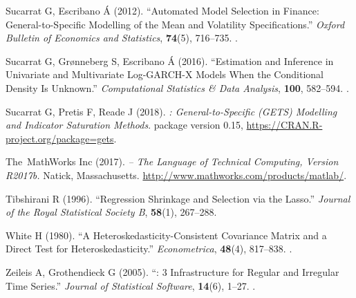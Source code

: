 \documentclass[article,nojss]{jss}
\begin{document}
\begin{thebibliography}{56}
	Sucarrat G, Escribano {\'A} (2012).
	\newblock \enquote{Automated Model Selection in Finance: General-to-Specific
		Modelling of the Mean and Volatility Specifications.}
	\newblock \emph{Oxford Bulletin of Economics and Statistics}, \textbf{74}(5),
	716--735.
	\newblock {}.
	
	Sucarrat G, Gr{\o}nneberg S, Escribano {\'A} (2016).
	\newblock \enquote{Estimation and Inference in Univariate and Multivariate
		Log-GARCH-X Models When the Conditional Density Is Unknown.}
	\newblock \emph{Computational Statistics \& Data Analysis}, \textbf{100},
	582--594.
	\newblock {}.
	
	Sucarrat G, Pretis F, Reade J (2018).
	\newblock \emph{: General-to-Specific (GETS) Modelling and Indicator
		Saturation Methods}.
	\newblock {} package version 0.15,
	\urlprefix\url{https://CRAN.R-project.org/package=gets}.
	
	{The~MathWorks Inc} (2017).
	\newblock \emph{ -- The Language of Technical Computing,
		Version R2017b.}
	\newblock Natick, Massachusetts.
	\newblock \urlprefix\url{http://www.mathworks.com/products/matlab/}.
	
	Tibshirani R (1996).
	\newblock \enquote{Regression Shrinkage and Selection via the Lasso.}
	\newblock \emph{Journal of the Royal Statistical Society B}, \textbf{58}(1),
	267--288.
	
	White H (1980).
	\newblock \enquote{A Heteroskedasticity-Consistent Covariance Matrix and a
		Direct Test for Heteroskedasticity.}
	\newblock \emph{Econometrica}, \textbf{48}(4), 817--838.
	\newblock {}.
	
	Zeileis A, Grothendieck G (2005).
	\newblock \enquote{: 3 Infrastructure for Regular and
		Irregular Time Series.}
	\newblock \emph{Journal of Statistical Software}, \textbf{14}(6), 1--27.
	\newblock {}.
	
\end{thebibliography}
\end{document}
